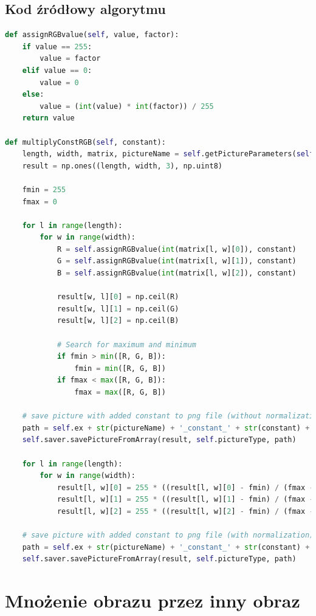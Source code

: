 \documentclass[a4paper,12pt, titlepage]{report}
\begin{document}
\subsection*{Kod źródłowy algorytmu}
\begin{lstlisting}[language=Python]
def assignRGBvalue(self, value, factor):
    if value == 255:
        value = factor
    elif value == 0:
        value = 0
    else:
        value = (int(value) * int(factor)) / 255
    return value

def multiplyConstRGB(self, constant):
    length, width, matrix, pictureName = self.getPictureParameters(self.pic1)
    result = np.ones((length, width, 3), np.uint8)

    fmin = 255
    fmax = 0

    for l in range(length):
        for w in range(width):
            R = self.assignRGBvalue(int(matrix[l, w][0]), constant)
            G = self.assignRGBvalue(int(matrix[l, w][1]), constant)
            B = self.assignRGBvalue(int(matrix[l, w][2]), constant)

            result[w, l][0] = np.ceil(R)
            result[w, l][1] = np.ceil(G)
            result[w, l][2] = np.ceil(B)

            # Search for maximum and minimum
            if fmin > min([R, G, B]):
                fmin = min([R, G, B])
            if fmax < max([R, G, B]):
                fmax = max([R, G, B])

    # save picture with added constant to png file (without normalization)
    path = self.ex + str(pictureName) + '_constant_' + str(constant) + '.png'
    self.saver.savePictureFromArray(result, self.pictureType, path)

    for l in range(length):
        for w in range(width):
            result[l, w][0] = 255 * ((result[l, w][0] - fmin) / (fmax - fmin))
            result[l, w][1] = 255 * ((result[l, w][1] - fmin) / (fmax - fmin))
            result[l, w][2] = 255 * ((result[l, w][2] - fmin) / (fmax - fmin))

    # save picture with added constant to png file (with normalization)
    path = self.ex + str(pictureName) + '_constant_' + str(constant) + '_normalized.png'
    self.saver.savePictureFromArray(result, self.pictureType, path)
\end{lstlisting}

\section{Mnożenie obrazu przez inny obraz}
\end{document}
